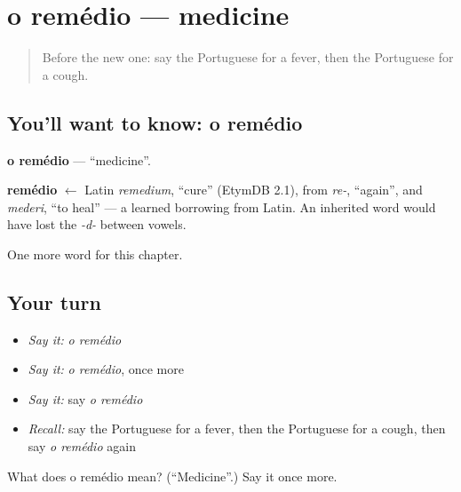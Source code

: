 \section[o remédio]{o remédio — medicine}

\label{lesson:PT-C34-remedio}



\begin{quote}
Before the new one: say the Portuguese for a fever, then the Portuguese for a cough.
\end{quote}

\subsection*{You'll want to know: o remédio}
\textbf{o remédio} — \textquotedblleft{}medicine\textquotedblright{}.

\begin{cousinweb}
\textbf{remédio} $\leftarrow$ Latin \emph{remedium}, \textquotedblleft{}cure\textquotedblright{} (EtymDB 2.1), from \emph{re-}, \textquotedblleft{}again\textquotedblright{}, and \emph{mederi}, \textquotedblleft{}to heal\textquotedblright{} — a learned borrowing from Latin. An inherited word would have lost the \emph{-d-} between vowels.
\end{cousinweb}

\begin{grammarlens}[title={What you've built}]
One more word for this chapter.
\end{grammarlens}

\subsection*{Your turn}
\begin{itemize}
\raggedright
  \item \emph{Say it:} \emph{o remédio}
  \item \emph{Say it:} \emph{o remédio}, once more
  \item \emph{Say it:} say \emph{o remédio}
  \item \emph{Recall:} say the Portuguese for a fever, then the Portuguese for a cough, then say \emph{o remédio} again
\end{itemize}

\begin{tcolorbox}[breakable,colback=teal!4,colframe=teal!35!black,title={Before you move on}]
What does o remédio mean? (\textquotedblleft{}Medicine\textquotedblright{}.) Say it once more.
\end{tcolorbox}
